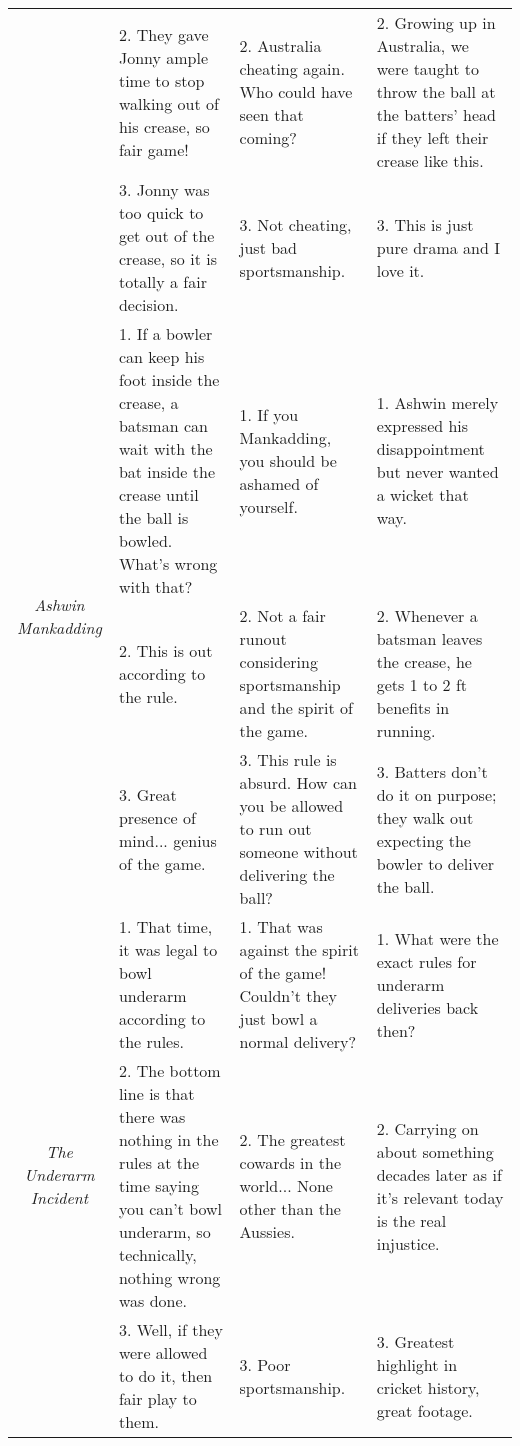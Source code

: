\documentclass{article}
\begin{document}
\begin{table*}[htbp]
{\begin{tabular}{|c|p{4cm}|p{4cm}|p{4cm}|}
            & 2. They gave Jonny ample time to stop walking out of his crease, so fair game! & 2. Australia cheating again. Who could have seen that coming? & 2. Growing up in Australia, we were taught to throw the ball at the batters' head if they left their crease like this. \\
            & 3. Jonny was too quick to get out of the crease, so it is totally a fair decision. & 3. Not cheating, just bad sportsmanship. & 3. This is just pure drama and I love it. \\
            \hline
            \multirow{3}{*}{\textit{Ashwin Mankadding}} 
            & 1. If a bowler can keep his foot inside the crease, a batsman can wait with the bat inside the crease until the ball is bowled. What's wrong with that? & 1. If you Mankadding, you should be ashamed of yourself. & 1. Ashwin merely expressed his disappointment but never wanted a wicket that way. \\
            & 2. This is out according to the rule. & 2. Not a fair runout considering sportsmanship and the spirit of the game. & 2. Whenever a batsman leaves the crease, he gets 1 to 2 ft benefits in running. \\
            & 3. Great presence of mind... genius of the game. & 3. This rule is absurd. How can you be allowed to run out someone without delivering the ball? & 3. Batters don’t do it on purpose; they walk out expecting the bowler to deliver the ball. \\
            \hline
            \multirow{3}{*}{\textit{The Underarm Incident}} 
            & 1. That time, it was legal to bowl underarm according to the rules. & 1. That was against the spirit of the game! Couldn't they just bowl a normal delivery? & 1. What were the exact rules for underarm deliveries back then? \\
            & 2. The bottom line is that there was nothing in the rules at the time saying you can't bowl underarm, so technically, nothing wrong was done. & 2. The greatest cowards in the world... None other than the Aussies. & 2. Carrying on about something decades later as if it's relevant today is the real injustice. \\
            & 3. Well, if they were allowed to do it, then fair play to them. & 3. Poor sportsmanship. & 3. Greatest highlight in cricket history, great footage. \\
            \hline
        \end{tabular}%
    }
    \caption{Examples of Favor, Against, and Neutral Comments for Controversial Events}
    \label{tab:event_comments}
\end{table*}
\end{document}
